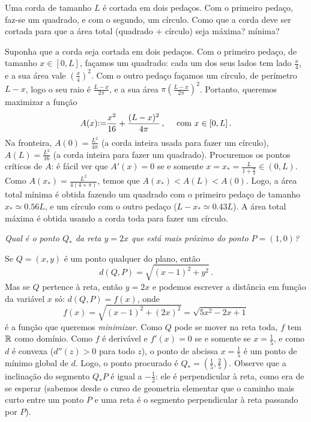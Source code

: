 \begin{exo}
Uma corda de tamanho $L$ é cortada em dois pedaços. Com o primeiro pedaço,
faz-se um quadrado, e com o segundo, um círculo. Como que a corda deve ser
cortada para que a área total (quadrado $+$
círculo) seja máxima? mínima?
\begin{sol}
Suponha que a corda seja cortada em dois pedaços. Com o primeiro pedaço, de
tamanho $x\in [0,L]$, façamos um quadrado: cada um dos seus lados tem lado
$\frac{x}{4}$, e a sua área vale $(\frac{x}{4})^2$. Com o outro pedaço façamos
um círculo, de perímetro $L-x$, logo o seu raio é $\frac{L-x}{2\pi}$, e a sua
área $\pi(\frac{L-x}{2\pi})^2$. Portanto, queremos maximizar a função 
$$
A(x){:=} \frac{x^2}{16}+\frac{(L-x)^2}{4\pi}\,,\quad \text{ com }x\in
[0,L]\,.
$$
Na fronteira, $A(0)=\frac{L^2}{4\pi}$ (a corda inteira usada para fazer um
círculo), $A(L)=\frac{L^2}{16}$ (a corda inteira para fazer um quadrado).
Procuremos os pontos críticos de $A$: é fácil ver que $A'(x)=0$ se e somente
$x=x_*=\frac{L}{1+\frac{\pi }{4}}\in (0,L)$.
Como $A(x_*)=\frac{L^2}{4(4+\pi)}$, temos que $A(x_*)<A(L)<A(0)$. Logo, 
a área total mínima é obtida fazendo um quadrado com o primeiro pedaço de
tamanho $x_*\simeq 0.56 L$, e  um círculo com o outro pedaço ($L-x_*\simeq
0.43 L$). A área total máxima é obtida usando a corda toda para fazer um
círculo.
\end{sol}
\end{exo}

\begin{ex}
\emph{Qual é o ponto $Q_*$ da reta $y={2x}$ que está mais próximo do ponto
$P=(1,0)$?}
\begin{center}
\begin{bmlimage}\end{bmlimage}
\end{center}
Se $Q=(x,y)$ é um ponto qualquer do plano, então
\[ d(Q,P)=\sqrt{(x-1)^2+y^2}\,.
\]
Mas se $Q$ pertence à reta, então $y=2x$ e podemos escrever a
distância em função da variável $x$ só: $d(Q,P)=f(x)$, onde 
\[ 
f(x)=\sqrt{(x-1)^2+(2x)^2}=
\sqrt{5x^2-2x+1}\,
\]
é a função que queremos \emph{minimizar}.
Como $Q$ pode se mover na reta toda, $f$ tem $\mathbb{R}$ como domínio.
Como $f$ é derivável e $f'(x)=0$
se e somente se $x=\frac15$, e como $d$ é convexa ($d''(z)>0$ para todo $z$), o
ponto de abcissa $x=\frac15$ é um ponto de mínimo global de $d$. Logo, o ponto
procurado é $Q_*=(\frac{1}{5},\frac{2}{5})$.
Observe que a inclinação do segmento $Q_*P$ é igual a $-\tfrac12$: ele
é perpendicular à reta, como era de se esperar (sabemos desde o curso
de geometria elementar que o caminho mais curto
entre um ponto $P$ e uma reta é o segmento perpendicular à reta passando
por $P$).
\end{ex}

